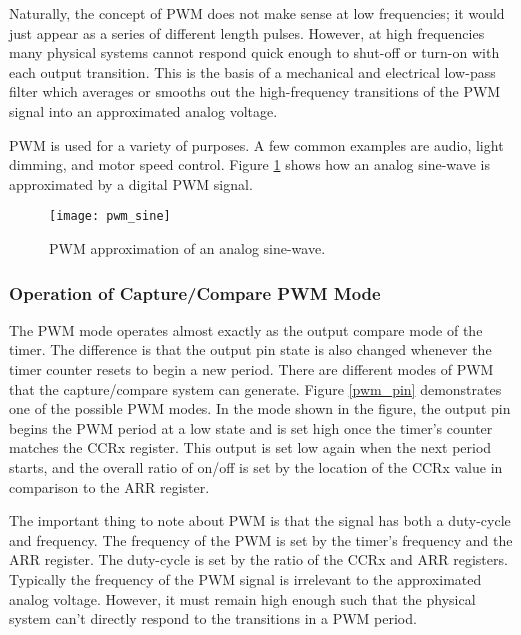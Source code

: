 \documentclass[openany,11pt,fleqn]{book} %
\begin{document}
    Naturally, the concept of PWM does not make sense at low frequencies; it would just appear as a series of different length pulses. However, at high frequencies many physical systems cannot respond quick enough to shut-off or turn-on with each output transition. This is the basis of a mechanical and electrical low-pass filter which averages or smooths out the high-frequency transitions of the PWM signal into an approximated analog voltage.
    
    PWM is used for a variety of purposes. A few common examples are audio, light dimming, and motor speed control. Figure \ref{pwm_sine} shows how an analog sine-wave is approximated by a digital PWM signal. 

    \begin{figure}[]
        \centering\texttt{[image: pwm\_sine]}
        \caption{PWM approximation of an analog sine-wave.}
        \label{pwm_sine}
    \end{figure}
    
    \subsubsection{Operation of Capture/Compare PWM Mode}
    The PWM mode operates almost exactly as the output compare mode of the timer. The difference is that the output pin state is also changed whenever the timer counter resets to begin a new period. There are different modes of PWM that the capture/compare system can generate. Figure \ref{pwm_pin} demonstrates one of the possible PWM modes. In the mode shown in the figure, the output pin begins the PWM period at a low state and is set high once the timer's counter matches the CCRx register. This output is set low again when the next period starts, and the overall ratio of on/off is set by the location of the CCRx value in comparison to the ARR register. 
   
   The important thing to note about PWM is that the signal has both a duty-cycle and frequency. The frequency of the PWM is set by the timer's frequency and the ARR register. The duty-cycle is set by the ratio of the CCRx and ARR registers. Typically the frequency of the PWM signal is irrelevant to the approximated analog voltage. However, it must remain high enough such that the physical system can't directly respond to the transitions in a PWM period. 
   
\end{document}
